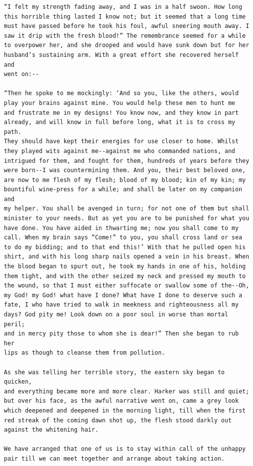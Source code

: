 \documentclass{article}
\begin{document}
\begin{verbatim}
“I felt my strength fading away, and I was in a half swoon. How long
this horrible thing lasted I know not; but it seemed that a long time
must have passed before he took his foul, awful sneering mouth away. I
saw it drip with the fresh blood!” The remembrance seemed for a while
to overpower her, and she drooped and would have sunk down but for her
husband’s sustaining arm. With a great effort she recovered herself and
went on:--

“Then he spoke to me mockingly: ‘And so you, like the others, would
play your brains against mine. You would help these men to hunt me
and frustrate me in my designs! You know now, and they know in part
already, and will know in full before long, what it is to cross my path.
They should have kept their energies for use closer to home. Whilst
they played wits against me--against me who commanded nations, and
intrigued for them, and fought for them, hundreds of years before they
were born--I was countermining them. And you, their best beloved one,
are now to me flesh of my flesh; blood of my blood; kin of my kin; my
bountiful wine-press for a while; and shall be later on my companion and
my helper. You shall be avenged in turn; for not one of them but shall
minister to your needs. But as yet you are to be punished for what you
have done. You have aided in thwarting me; now you shall come to my
call. When my brain says “Come!” to you, you shall cross land or sea
to do my bidding; and to that end this!’ With that he pulled open his
shirt, and with his long sharp nails opened a vein in his breast. When
the blood began to spurt out, he took my hands in one of his, holding
them tight, and with the other seized my neck and pressed my mouth to
the wound, so that I must either suffocate or swallow some of the--Oh,
my God! my God! what have I done? What have I done to deserve such a
fate, I who have tried to walk in meekness and righteousness all my
days? God pity me! Look down on a poor soul in worse than mortal peril;
and in mercy pity those to whom she is dear!” Then she began to rub her
lips as though to cleanse them from pollution.

As she was telling her terrible story, the eastern sky began to quicken,
and everything became more and more clear. Harker was still and quiet;
but over his face, as the awful narrative went on, came a grey look
which deepened and deepened in the morning light, till when the first
red streak of the coming dawn shot up, the flesh stood darkly out
against the whitening hair.

We have arranged that one of us is to stay within call of the unhappy
pair till we can meet together and arrange about taking action.


\end{verbatim}
\end{document}
